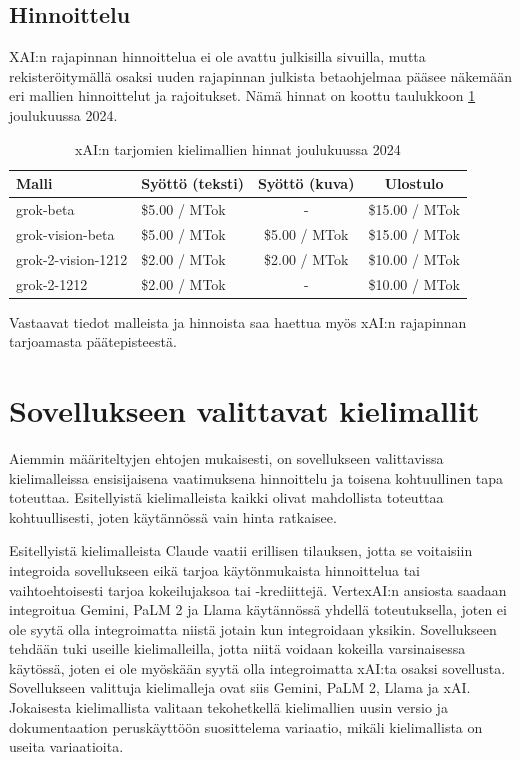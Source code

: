 \subsection{Hinnoittelu}

XAI:n rajapinnan hinnoittelua ei ole avattu julkisilla sivuilla, mutta
rekisteröitymällä osaksi uuden rajapinnan julkista betaohjelmaa pääsee näkemään
eri mallien hinnoittelut ja rajoitukset. Nämä hinnat on koottu taulukkoon
\ref{tab:grok-prices} joulukuussa 2024.

\begin{table}[H]
    \centering
    \caption{xAI:n tarjomien kielimallien hinnat joulukuussa 2024}
    \label{tab:grok-prices}
    \begin{tabular}{llcc}
        \textbf{Malli} & \textbf{Syöttö (teksti)} & \textbf{Syöttö (kuva)} & \textbf{Ulostulo} \\
        \hline
        grok-beta          & \$5.00 / MTok &             - & \$15.00 / MTok \\
        grok-vision-beta   & \$5.00 / MTok & \$5.00 / MTok & \$15.00 / MTok \\
        grok-2-vision-1212 & \$2.00 / MTok & \$2.00 / MTok & \$10.00 / MTok \\
        grok-2-1212        & \$2.00 / MTok &             - & \$10.00 / MTok \\
        \hline
    \end{tabular}
\end{table}

Vastaavat tiedot malleista ja hinnoista saa haettua myös xAI:n rajapinnan
tarjoamasta päätepisteestä. \parencite{xAIDocsEndpoints}

\section{Sovellukseen valittavat kielimallit}

Aiemmin määriteltyjen ehtojen mukaisesti, on sovellukseen valittavissa
kielimalleissa ensisijaisena vaatimuksena hinnoittelu ja toisena kohtuullinen
tapa toteuttaa. Esitellyistä kielimalleista kaikki olivat mahdollista toteuttaa
kohtuullisesti, joten käytännössä vain hinta ratkaisee.

Esitellyistä kielimalleista Claude vaatii erillisen tilauksen, jotta se
voitaisiin integroida sovellukseen eikä tarjoa käytönmukaista hinnoittelua tai
vaihtoehtoisesti tarjoa kokeilujaksoa tai -krediittejä. VertexAI:n ansiosta
saadaan integroitua Gemini, PaLM 2 ja Llama käytännössä yhdellä toteutuksella,
joten ei ole syytä olla integroimatta niistä jotain kun integroidaan yksikin.
Sovellukseen tehdään tuki useille kielimalleilla, jotta niitä voidaan kokeilla
varsinaisessa käytössä, joten ei ole myöskään syytä olla integroimatta xAI:ta
osaksi sovellusta. Sovellukseen valittuja kielimalleja ovat siis Gemini,
PaLM 2, Llama ja xAI. Jokaisesta kielimallista valitaan tekohetkellä
kielimallien uusin versio ja dokumentaation peruskäyttöön suosittelema
variaatio, mikäli kielimallista on useita variaatioita.
